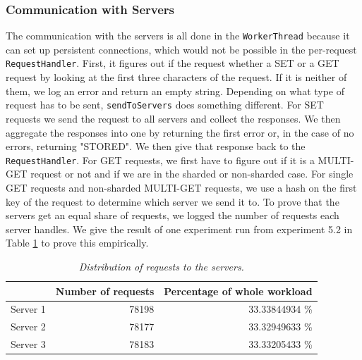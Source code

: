 \documentclass[11pt,a4paper]{article}
\newcommand{\co}[1]{\texttt{#1}}
\begin{document}
\subsubsection{Communication with Servers}
The communication with the servers is all done in the \co{WorkerThread} because it can set up persistent connections, which would not be possible in the per-request \co{RequestHandler}. First, it figures out if the request whether a SET or a GET request by looking at the first three characters of the request. If it is neither of them, we log an error and return an empty string. Depending on what type of request has to be sent, \co{sendToServers} does something different. For SET requests we send the request to all servers and collect the responses. We then aggregate the responses into one by returning the first error or, in the case of no errors, returning "STORED". We then give that response back to the \co{RequestHandler}. For GET requests, we first have to figure out if it is a MULTI-GET request or not and if we are in the sharded or non-sharded case. For single GET requests and non-sharded MULTI-GET requests, we use a hash on the first key of the request to determine which server we send it to. To prove that the servers get an equal share of requests, we logged the number of requests each server handles. We give the result of one experiment run from experiment 5.2 in Table \ref{Table:1_proof} to prove this empirically.

\begin{table}[H]
	\centering
		\begin{tabular}{|r|r|r|} 
			\hline 		& Number of requests	& Percentage of whole workload\\			
			\hline Server 1   & 78198      					& 33.33844934 \%              \\ 
			\hline Server 2  	& 78177  						& 33.32949633 \%                   \\ 
			\hline Server 3 	& 78183                      	& 33.33205433 \%\\ 
			\hline 
		\end{tabular}
		\caption{\textit{Distribution of requests to the servers.}}
		\label{Table:1_proof}
\end{table}
\end{document}
